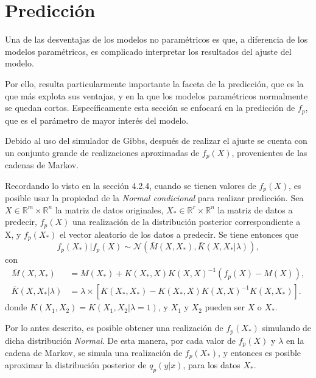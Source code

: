 \section{Predicci\'on}

Una de las desventajas de los modelos no param\'etricos es que, a diferencia de los modelos param\'etricos, es complicado interpretar los resultados del ajuste del modelo.

Por ello, resulta particularmente importante la faceta de la predicci\'on, que es la que m\'as explota sus ventajas, y en la que los modelos param\'etricos normalmente se quedan cortos. Espec\'ificamente esta secci\'on se enfocar\'a en la predicci\'on de $f_p$, que es el par\'ametro de mayor inter\'es del modelo.

Debido al uso del simulador de Gibbs, despu\'es de realizar el ajuste se cuenta con un conjunto grande de realizaciones aproximadas de $f_p(X)$, provenientes de las cadenas de Markov.

Recordando lo visto en la secci\'on 4.2.4, cuando se tienen valores de $f_p(X)$, es posible usar la propiedad de la \textit{Normal condicional} para realizar predicci\'on. Sea $X \in \mathbb{R}^m \times \mathbb{R}^n$ la matriz de datos originales, $X_* \in \mathbb{R}^r \times \mathbb{R}^n$ la matriz de datos a predecir, $f_p(X)$ una realizaci\'on de la distribuci\'on posterior correspondiente a X, y $f_p(X_*)$ el vector aleatorio de los datos a predecir. Se tiene entonces que 
\begin{equation*}
    f_p(X_*)|f_p(X) 
    \sim \mathcal{N}
    (\bar{M}(X,X_*),\bar{K}(X,X_*|\lambda)),
\end{equation*}
con
\begin{equation*}
\begin{aligned}
    \bar{M}(X,X_*) &= M(X_*) + K(X_*,X)K(X,X)^{-1}(f_p(X) - M(X)), \\
    \bar{K}(X,X_*|\lambda) &= 
    \lambda
    \times
    \left[
    K(X_*,X_*) -
    K(X_*,X)K(X,X)^{-1}K(X,X_*)
    \right]
    .
\end{aligned}
\end{equation*}
donde $K(X_1,X_2) = K(X_1,X_2|\lambda=1)$, y $X_1$ y $X_2$ pueden ser $X$ o $X_*$.

Por lo antes descrito, es posible obtener una realizaci\'on de $f_p(X_*)$ simulando de dicha distribuci\'on \textit{Normal}. De esta manera, por cada valor de $f_p(X)$ y $\lambda$ en la cadena de Markov, se simula una realizaci\'on de $f_p(X_*)$, y entonces es posible aproximar la distribuci\'on posterior de $q_p(y|x)$, para los datos $X_*$.

